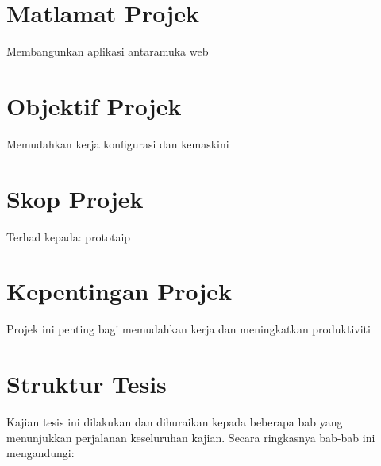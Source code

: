 \section{Matlamat Projek}
Membangunkan aplikasi antaramuka web

\section{Objektif Projek}
Memudahkan kerja konfigurasi dan kemaskini

\section{Skop Projek}
Terhad kepada:
prototaip

\section{Kepentingan Projek}
Projek ini penting bagi memudahkan kerja dan meningkatkan produktiviti

\section{Struktur Tesis}
Kajian tesis ini dilakukan dan dihuraikan kepada beberapa bab yang menunjukkan perjalanan keseluruhan kajian. Secara ringkasnya bab-bab ini mengandungi:
\bgroup
\renewcommand\theenumi{\roman{enumi}}

